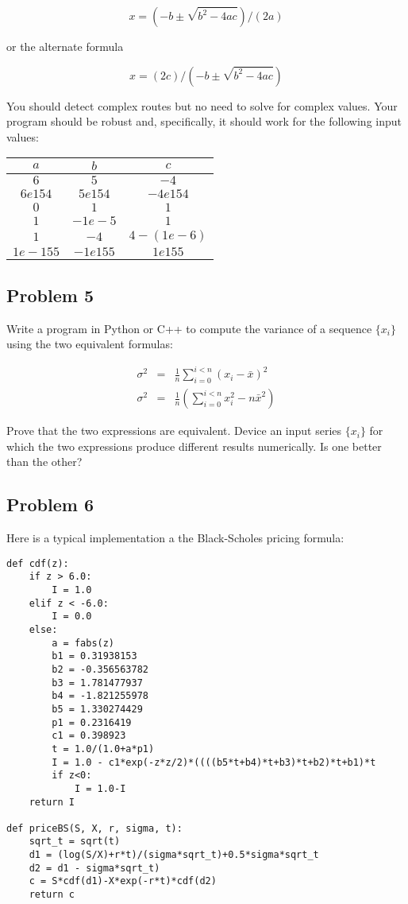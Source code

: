 \documentclass[12pt]{article}
\begin{document}
\[
x = (-b \pm \sqrt{b^2-4ac})/(2a)
\]

or the alternate formula

\[
x = (2c)/(-b \pm \sqrt{b^2-4ac})
\]

You should detect complex routes but no need to solve for complex values.
Your program should be robust and, specifically, it should work for the following input values:

\begin{tabular}{ccc}
$a$ & $b$ & $c$ \\ \hline
$6$ & $5$ & $-4$ \\
$6e154$ & $5e154$ & $-4e154$ \\
$0$ & $1$ & $1$ \\
$1$ & $-1e-5$ & $1$ \\
$1$ & $-4$ & $4-(1e-6)$ \\
$1e-155$ & $-1e155$ & $1e155$ 
\end{tabular}

\subsection{Problem 5}

Write a program in Python or C++ to compute the variance of a sequence $\{x_i\}$ using the two equivalent formulas:

\begin{eqnarray}
\sigma^2 &=& \frac1{n}\sum_{i=0}^{i<n} (x_i-\bar x)^2 \\
\sigma^2 &=& \frac1{n}\left( \sum_{i=0}^{i<n} x^2_i-n\bar x^2 \right)
\end{eqnarray}

Prove that the two expressions are equivalent. Device an input series $\{x_i\}$ for which the two expressions produce different results numerically. Is one better than the other?

\subsection{Problem 6}

Here is a typical implementation a the Black-Scholes pricing formula:

\begin{verbatim}
def cdf(z):
    if z > 6.0:
        I = 1.0
    elif z < -6.0:
        I = 0.0
    else:
        a = fabs(z)
        b1 = 0.31938153
        b2 = -0.356563782
        b3 = 1.781477937
        b4 = -1.821255978
        b5 = 1.330274429
        p1 = 0.2316419
        c1 = 0.398923
        t = 1.0/(1.0+a*p1)
        I = 1.0 - c1*exp(-z*z/2)*((((b5*t+b4)*t+b3)*t+b2)*t+b1)*t
        if z<0:
            I = 1.0-I
    return I

def priceBS(S, X, r, sigma, t):
    sqrt_t = sqrt(t)
    d1 = (log(S/X)+r*t)/(sigma*sqrt_t)+0.5*sigma*sqrt_t
    d2 = d1 - sigma*sqrt_t)
    c = S*cdf(d1)-X*exp(-r*t)*cdf(d2)
    return c
\end{verbatim}
\end{document}
